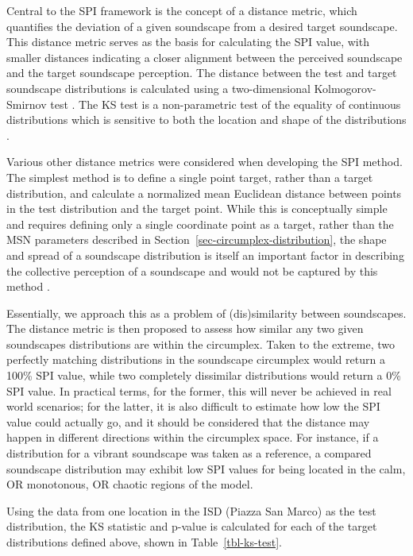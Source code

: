 \documentclass[
  authoryear,
  preprint,
  3p]{elsarticle}
\begin{document}
Central to the SPI framework is the concept of a distance metric, which
quantifies the deviation of a given soundscape from a desired target
soundscape. This distance metric serves as the basis for calculating the
SPI value, with smaller distances indicating a closer alignment between
the perceived soundscape and the target soundscape perception. The
distance between the test and target soundscape distributions is
calculated using a two-dimensional Kolmogorov-Smirnov test
\citep{Fasano1987multidimensional}. The KS test is a non-parametric test
of the equality of continuous distributions which is sensitive to both
the location and shape of the distributions
\citep{Chakravati1967Handbook}.

Various other distance metrics were considered when developing the SPI
method. The simplest method is to define a single point target, rather
than a target distribution, and calculate a normalized mean Euclidean
distance between points in the test distribution and the target point.
While this is conceptually simple and requires defining only a single
coordinate point as a target, rather than the MSN parameters described
in Section~\ref{sec-circumplex-distribution}, the shape and spread of a
soundscape distribution is itself an important factor in describing the
collective perception of a soundscape and would not be captured by this
method \citep{Mitchell2022How}.

Essentially, we approach this as a problem of (dis)similarity between
soundscapes. The distance metric is then proposed to assess how similar
any two given soundscapes distributions are within the circumplex. Taken
to the extreme, two perfectly matching distributions in the soundscape
circumplex would return a 100\% SPI value, while two completely
dissimilar distributions would return a 0\% SPI value. In practical
terms, for the former, this will never be achieved in real world
scenarios; for the latter, it is also difficult to estimate how low the
SPI value could actually go, and it should be considered that the
distance may happen in different directions within the circumplex space.
For instance, if a distribution for a vibrant soundscape was taken as a
reference, a compared soundscape distribution may exhibit low SPI values
for being located in the calm, OR monotonous, OR chaotic regions of the
model.

Using the data from one location in the ISD (Piazza San Marco) as the
test distribution, the KS statistic and p-value is calculated for each
of the target distributions defined above, shown in
Table~\ref{tbl-ks-test}.
\end{document}
